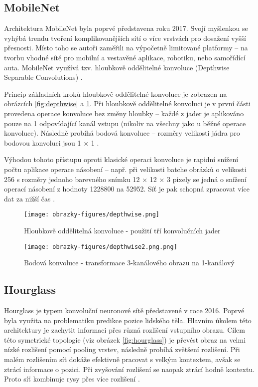 \subsection{MobileNet}
Architektura MobileNet byla poprvé představena roku 2017. Svojí myšlenkou se vyhýbá trendu tvoření komplikovanějších sítí o více vrstvách pro dosažení vyšší přesnosti. Místo toho se autoři zaměřili na výpočetně limitované platformy -- na tvorbu vhodné sítě pro mobilní a vestavěné aplikace, robotiku, nebo samořídící auta. MobileNet využívá tzv. hloubkově oddělitelné konvoluce (Depthwise Separable Convolutions) \cite{MobileNet}.

Princip základních kroků hloubkově oddělitelné konvoluce je zobrazen na obrázcích \ref{fig:depthwise} a \ref{fig:depthwise2}. Při hloubkově oddělitelné konvoluci je v první části provedena operace konvoluce bez změny hloubky -- každé z jader je aplikováno pouze na 1 odpovídající kanál vstupu (nikoliv na všechny jako u běžné operace konvoluce). Následně probíhá bodová konvoluce -- rozměry velikosti jádra pro bodovou konvoluci jsou 1 $\times$ 1 \cite{SeparableConvolutions}.

Výhodou tohoto přístupu oproti klasické operaci konvoluce je rapidní snížení počtu aplikace operace násobení -- např. při velikosti batche obrázků o velikosti 256 s rozměry jednoho barevného snímku 12 $\times$ 12 $\times$ 3 pixely se jedná o snížení operací násobení z hodnoty 1228800 na 52952. Síť je pak schopná zpracovat více dat za nižší čas \cite{SeparableConvolutions}. 

\begin{figure}[!htbp]
  \begin{minipage}[b]{0.5\linewidth}
    \centering
    \texttt{[image: obrazky-figures/depthwise.png]}
    \caption{Hloubkově oddělitelná konvoluce - použití tří konvolučních jader \cite{SeparableConvolutions}}
    \label{fig:depthwise}
  \end{minipage}
  \hspace{0.5cm}
  \begin{minipage}[b]{0.5\linewidth}
    \centering
    \texttt{[image: obrazky-figures/depthwise2.png.png]}
    \caption{Bodová konvoluce - transformace 3-kanálového obrazu na 1-kanálový \cite{SeparableConvolutions}}
    \label{fig:depthwise2}
  \end{minipage}
\end{figure}

\subsection{Hourglass}
Hourglass je typem konvoluční neuronové sítě představené v roce 2016. Poprvé byla využita na problematiku predikce pozice lidského těla. Hlavním úkolem této architektury je zachytit informaci přes různá rozlišení vstupního obrazu. Cílem této symetrické topologie (viz obrázek \ref{fig:hourglass}) je převést obraz na velmi nízké rozlišení pomocí pooling vrstev, následně probíhá zvětšení rozlišení. Při malém rozlišením síť dokáže efektivně pracovat s velkým kontextem, avšak se ztrácí informace o pozici. Při zvyšování rozlišení se naopak ztrácí hodně kontextu. Proto síť kombinuje rysy přes více rozlišení \cite{Hourglass}.

